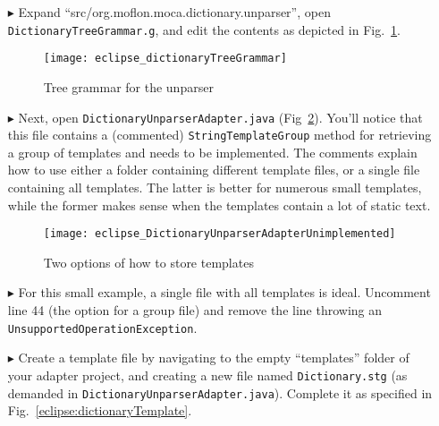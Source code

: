 \begin{itemize}

\item[$\blacktriangleright$] Expand ``src/org.moflon.moca.dictionary.unparser'', open \texttt{Dict\-ion\-ary\-Tree\-Gram\-mar.g}, and edit the contents as
depicted in Fig.~\ref{eclipse:treeGrammar}. 

\begin{figure}[htpb]
\begin{center}
  \texttt{[image: eclipse\_dictionaryTreeGrammar]}
  \caption{Tree grammar for the unparser}
  \label{eclipse:treeGrammar}
\end{center}
\end{figure}

\item[$\blacktriangleright$] Next, open \texttt{Dict\-ion\-ary\-Un\-pars\-er\-Ad\-ap\-ter.java} (Fig~\ref{eclipse:unparserCommented}). You'll notice that this
file contains a (commented) \texttt{StringTemplateGroup} method for retrieving a group of templates and needs to be implemented. The comments explain how to use
either a folder containing different template files, or a single file containing all templates. The latter is better for numerous small templates, while the
former makes sense when the templates contain a lot of static text.

\vspace{0.5cm}

\begin{figure}[htpb]
\begin{center}
  \texttt{[image: eclipse\_DictionaryUnparserAdapterUnimplemented]}
  \caption{Two options of how to store templates}
  \label{eclipse:unparserCommented}
\end{center}
\end{figure}


\item[$\blacktriangleright$] For this small example, a single file with all templates is ideal. Uncomment line 44 (the option for a group file) and remove
the line throwing an \texttt{Un\-sup\-port\-ed\-Op\-er\-at\-ion\-Ex\-cep\-tion}.

\item[$\blacktriangleright$] Create a template file by navigating to the empty ``templates'' folder of your adapter project, and creating a new file
named \texttt{Dictionary.stg} (as demanded in \texttt{Dict\-ion\-ary\-Un\-pars\-er\-Ad\-ap\-ter.java}). Complete it as specified in
Fig.~\ref{eclipse:dictionaryTemplate}.


\end{itemize}

